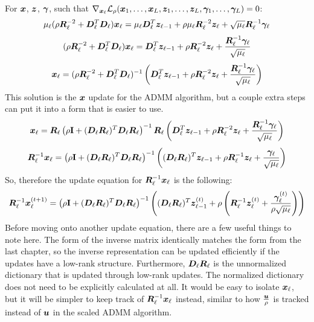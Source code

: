 For $\bm{x}$, $\bm{z}$, $\bm{\gamma}$, such that $\nabla_{\bm{x}_{\ell}} \mathcal{L}_{\rho}(\bm{x}_1,\hdots,\bm{x}_L,\bm{z}_1,\hdots,\bm{z}_L,\bm{\gamma}_1,\hdots,\bm{\gamma}_L) = 0$:
%
\begin{equation}
\mu_{\ell}(\rho \bm{R}_{\ell}^{-2} + \bm{D}_{\ell}^T\bm{D}_{\ell})\bm{x}_{\ell} = \mu_{\ell}\bm{D}_{\ell}^T\bm{z}_{\ell - 1} + \rho \mu_{\ell}\bm{R}_{\ell}^{-2}\bm{z}_{\ell} + \sqrt{\mu_{\ell}}\bm{R}_{\ell}^{-1}\bm{\gamma}_{\ell}
\end{equation}
%
\begin{equation}
(\rho \bm{R}_{\ell}^{-2} + \bm{D}_{\ell}^T\bm{D}_{\ell})\bm{x}_{\ell} = \bm{D}_{\ell}^T\bm{z}_{\ell - 1} + \rho \bm{R}_{\ell}^{-2}\bm{z}_{\ell} + \frac{\bm{R}_{\ell}^{-1}\bm{\gamma}_{\ell}}{\sqrt{\mu_{\ell}}}
\end{equation}
%
\begin{equation}
\bm{x}_{\ell} = (\rho \bm{R}_{\ell}^{-2} + \bm{D}_{\ell}^T\bm{D}_{\ell})^{-1}\left(\bm{D}_{\ell}^T\bm{z}_{\ell - 1} + \rho \bm{R}_{\ell}^{-2}\bm{z}_{\ell} + \frac{\bm{R}_{\ell}^{-1}\bm{\gamma}_{\ell}}{\sqrt{\mu_{\ell}}}\right)
\end{equation}
%
This solution is the $\bm{x}$ update for the ADMM algorithm, but a couple extra steps can put it into a form that is easier to use.
%
\begin{equation}
\bm{x}_{\ell} = \bm{R}_{\ell}\left(\rho {\bf I} + (\bm{D}_{\ell}\bm{R}_{\ell})^T\bm{D}_{\ell}\bm{R}_{\ell}\right)^{-1}\bm{R}_{\ell}\left(\bm{D}_{\ell}^T\bm{z}_{\ell - 1} + \rho \bm{R}_{\ell}^{-2}\bm{z}_{\ell} + \frac{\bm{R}_{\ell}^{-1}\bm{\gamma}_{\ell}}{\sqrt{\mu_{\ell}}}\right)
\end{equation}
%
\begin{equation}
\bm{R}_{\ell}^{-1}\bm{x}_{\ell} = \left(\rho {\bf I} + (\bm{D}_{\ell}\bm{R}_{\ell})^T\bm{D}_{\ell}\bm{R}_{\ell}\right)^{-1}\left((\bm{D}_{\ell}\bm{R}_{\ell})^T\bm{z}_{\ell - 1} + \rho \bm{R}_{\ell}^{-1}\bm{z}_{\ell} + \frac{\bm{\gamma}_{\ell}}{\sqrt{\mu_{\ell}}}\right)
\end{equation}
%
So, therefore the update equation for $\bm{R}_{\ell}^{-1}\bm{x}_{\ell}$ is the following:
%
\begin{equation} \label{equation:Multi-Layer x-Update Equation}
\bm{R}_{\ell}^{-1}\bm{x}_{\ell}^{(t + 1)} = \left(\rho {\bf I} + (\bm{D}_{\ell}\bm{R}_{\ell})^T\bm{D}_{\ell}\bm{R}_{\ell}\right)^{-1}\left((\bm{D}_{\ell}\bm{R}_{\ell})^T\bm{z}_{\ell - 1}^{(t)} + \rho \left(\bm{R}_{\ell}^{-1}\bm{z}_{\ell}^{(t)} + \frac{\bm{\gamma}_{\ell}^{(t)}}{\rho\sqrt{\mu_{\ell}}}\right)\right)
\end{equation}
%
Before moving onto another update equation, there are a few useful things to note here. The form of the inverse matrix identically matches the form from the last chapter, so the inverse representation can be updated efficiently if the updates have a low-rank structure. Furthermore, $\bm{D}_{\ell}\bm{R}_{\ell}$ is the unnormalized dictionary that is updated through low-rank updates. The normalized dictionary does not need to be explicitly calculated at all. It would be easy to isolate $\bm{x}_{\ell}$, but it will be simpler to keep track of $\bm{R}_{\ell}^{-1}\bm{x}_{\ell}$ instead, similar to how $\frac{\bm{u}}{\rho}$ is tracked instead of $\bm{u}$ in the scaled ADMM algorithm.

